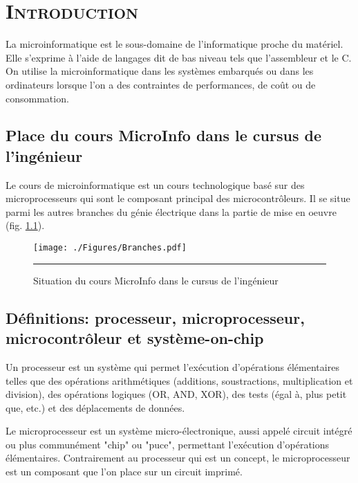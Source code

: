 
\chapter{\textsc{Introduction}}
\label{Chapter1} %




La microinformatique est le sous-domaine de l'informatique proche du matériel. Elle s'exprime à l'aide de langages dit de bas niveau tels que l'assembleur et le C. On utilise la microinformatique dans les systèmes embarqués ou dans les ordinateurs lorsque l'on a des contraintes de performances, de coût ou de consommation.

\section{Place du cours MicroInfo dans le cursus de l'ingénieur}

Le cours de microinformatique est un cours technologique basé sur des microprocesseurs qui sont le composant principal des microcontrôleurs.  Il se situe parmi les autres branches du génie électrique dans la partie de mise en oeuvre (fig. \ref{fig:Branches}).

\begin{figure}[htb]
  \centering
  \texttt{[image: ./Figures/Branches.pdf]}
  \rule{35em}{0.5pt}
  \caption[Situation]{Situation du cours MicroInfo dans le cursus de l'ingénieur}
  \label{fig:Branches}
\end{figure}


\section{Définitions: processeur, microprocesseur, microcontrôleur et système-on-chip}

Un processeur est un système qui permet l'exécution d'opérations élémentaires telles que des opérations arithmétiques (additions, soustractions, multiplication et division), des opérations logiques (OR, AND, XOR), des tests (égal à, plus petit que, etc.) et des déplacements de données.

Le microprocesseur est un système micro-électronique, aussi appelé circuit intégré ou plus communément "chip" ou "puce", permettant l'exécution d'opérations élémentaires. Contrairement au processeur qui est un concept, le microprocesseur est un composant que l'on place sur un circuit imprimé.

